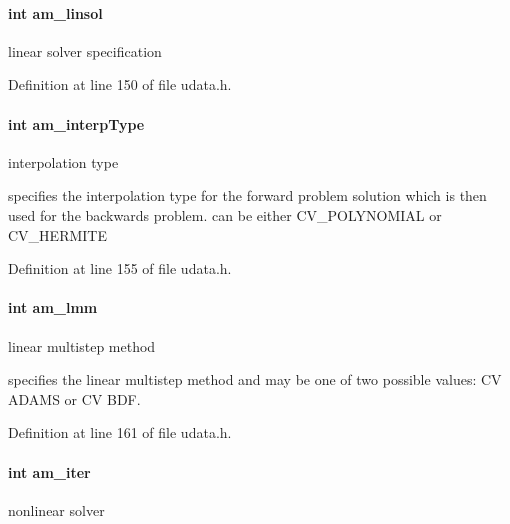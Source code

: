 \paragraph[{am\+\_\+linsol}]{\setlength{\rightskip}{0pt plus 5cm}int am\+\_\+linsol}\label{struct_user_data_a03fa52449ab4bb9a1a75312fd9064db1}
linear solver specification 

Definition at line 150 of file udata.\+h.

\hypertarget{struct_user_data_a02adc800558b1cdac3fa8bc96e65dbbb}{}
\paragraph[{am\+\_\+interp\+Type}]{\setlength{\rightskip}{0pt plus 5cm}int am\+\_\+interp\+Type}\label{struct_user_data_a02adc800558b1cdac3fa8bc96e65dbbb}
interpolation type

specifies the interpolation type for the forward problem solution which is then used for the backwards problem. can be either C\+V\+\_\+\+P\+O\+L\+Y\+N\+O\+M\+I\+A\+L or C\+V\+\_\+\+H\+E\+R\+M\+I\+T\+E 

Definition at line 155 of file udata.\+h.

\hypertarget{struct_user_data_a18b6fbc6159783acab9b5f4b106077cd}{}
\paragraph[{am\+\_\+lmm}]{\setlength{\rightskip}{0pt plus 5cm}int am\+\_\+lmm}\label{struct_user_data_a18b6fbc6159783acab9b5f4b106077cd}
linear multistep method

specifies the linear multistep method and may be one of two possible values\+: C\+V A\+D\+A\+M\+S or C\+V B\+D\+F. 

Definition at line 161 of file udata.\+h.

\hypertarget{struct_user_data_a2e0183eade68209e6835d3199054f0cc}{}
\paragraph[{am\+\_\+iter}]{\setlength{\rightskip}{0pt plus 5cm}int am\+\_\+iter}\label{struct_user_data_a2e0183eade68209e6835d3199054f0cc}
nonlinear solver

